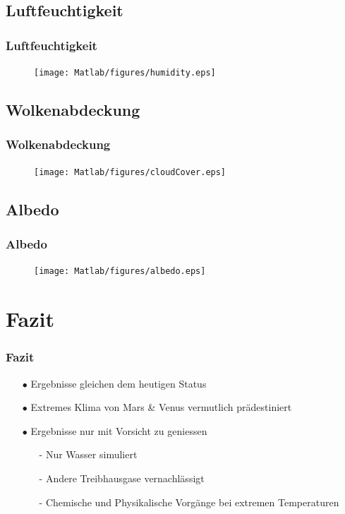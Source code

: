 \documentclass[english, aspectratio=169]{beamer}
\begin{document}
\subsection{Luftfeuchtigkeit}
\begin{frame}
	\frametitle{Luftfeuchtigkeit}
		\begin{figure}
			\texttt{[image: Matlab/figures/humidity.eps]}
		\end{figure}
\end{frame}

\subsection{Wolkenabdeckung}
\begin{frame}
	\frametitle{Wolkenabdeckung}
		\begin{figure}
			\texttt{[image: Matlab/figures/cloudCover.eps]}
		\end{figure}
\end{frame}

\subsection{Albedo}
\begin{frame}
	\frametitle{Albedo}
		\begin{figure}
			\texttt{[image: Matlab/figures/albedo.eps]}
		\end{figure}
\end{frame}

\section{Fazit}
\begin{frame}
\frametitle{Fazit}
\begin{itemize}

	\item[$\bullet$] Ergebnisse gleichen dem heutigen Status
	\item[$\bullet$] Extremes Klima von Mars \& Venus vermutlich prädestiniert
	
	\vspace{5mm}
	
	\item[$\bullet$] Ergebnisse nur mit Vorsicht zu geniessen	
	\begin{itemize}
		\item[-] Nur Wasser simuliert
		\item[-] Andere Treibhausgase vernachlässigt
		\item[-] Chemische und Physikalische Vorgänge bei extremen Temperaturen
	\end{itemize}

	
\end{itemize}
\end{frame}
\end{document}
